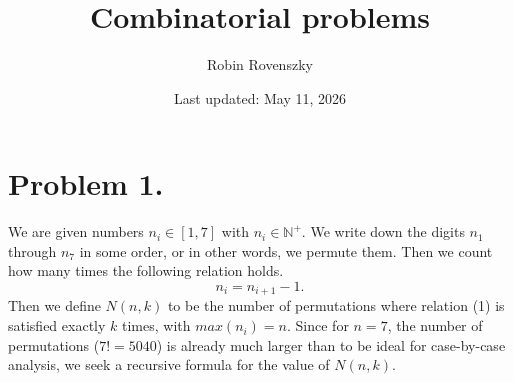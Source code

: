 \documentclass{article}
\title{Combinatorial problems}
\author{Robin Rovenszky}
\date{Last updated: May 11, 2026}
\begin{document}
\maketitle

\section{Problem 1.}
We are given numbers $n_i \in [1, 7]$ with $n_i \in \mathbb{N^+}$. We write down the digits $n_1$ through $n_7$ in some order, or in other words, we permute them. Then we count how many times the following relation holds.
\begin{equation}
n_i = n_{i+1} - 1.
\end{equation}
Then we define $N(n, k)$ to be the number of permutations where relation (1) is satisfied exactly $k$ times, with $max(n_i) = n$.
Since for $n = 7$, the number of permutations ($7! = 5040$) is already much larger than to be ideal for case-by-case analysis, we seek a recursive formula for the value of $N(n, k)$.
\end{document}
